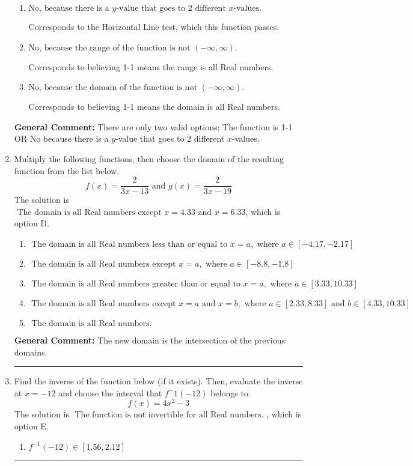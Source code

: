 \documentclass{extbook}[14pt]
\newcommand{\litem}[1]{\item #1

\rule{\textwidth}{0.4pt}}
\begin{document}
\begin{enumerate}
{\begin{enumerate}[label=\Alph*.]
* This is the solution.
\item \( \text{No, because there is a $y$-value that goes to 2 different $x$-values.} \)

Corresponds to the Horizontal Line test, which this function passes.
\item \( \text{No, because the range of the function is not $(-\infty, \infty)$.} \)

Corresponds to believing 1-1 means the range is all Real numbers.
\item \( \text{No, because the domain of the function is not $(-\infty, \infty)$.} \)

Corresponds to believing 1-1 means the domain is all Real numbers.
\end{enumerate}

\textbf{General Comment:} There are only two valid options: The function is 1-1 OR No because there is a $y$-value that goes to 2 different $x$-values.
}
\litem{
Multiply the following functions, then choose the domain of the resulting function from the list below.
\[ f(x) = \frac{2}{3x-13} \text{ and } g(x) = \frac{2}{3x-19} \]The solution is \( \text{ The domain is all Real numbers except } x = 4.33 \text{ and } x = 6.33 \), which is option D.\begin{enumerate}[label=\Alph*.]
\item \( \text{ The domain is all Real numbers less than or equal to } x = a, \text{ where } a \in [-4.17, -2.17] \)


\item \( \text{ The domain is all Real numbers except } x = a, \text{ where } a \in [-8.8, -1.8] \)


\item \( \text{ The domain is all Real numbers greater than or equal to } x = a, \text{ where } a \in [3.33, 10.33] \)


\item \( \text{ The domain is all Real numbers except } x = a \text{ and } x = b, \text{ where } a \in [2.33, 8.33] \text{ and } b \in [4.33, 10.33] \)


\item \( \text{ The domain is all Real numbers. } \)


\end{enumerate}

\textbf{General Comment:} The new domain is the intersection of the previous domains.
}
\litem{
Find the inverse of the function below (if it exists). Then, evaluate the inverse at $x = -12$ and choose the interval that $f^-1(-12)$ belongs to.
\[ f(x) = 4 x^2 - 3 \]The solution is \( \text{ The function is not invertible for all Real numbers. } \), which is option E.\begin{enumerate}[label=\Alph*.]
\item \( f^{-1}(-12) \in [1.56, 2.12] \)


\end{enumerate}}
\end{enumerate}
\end{document}
